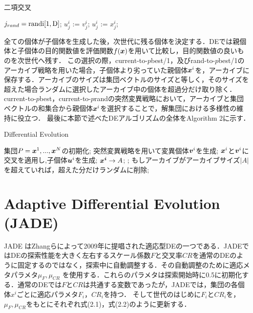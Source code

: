 \documentclass[a4paper,11pt,oneside,openany]{jsbook}
\def\vector#1{\mbox{\boldmath $#1$}}
\begin{document}
\begin{algorithm}
\caption{二項交叉}
\label{alg:pbnf}
\begin{algorithmic}
\STATE $j_{rand} = \rm{randi}[1, D]$;
  \IF {$\rm{rand}[0,1) \leqq $ \OR $j == j_{rand} $}
    \STATE $u^i_j$ := $v^i_j$;
  \ELSE
    \STATE $u^i_j$ := $x^i_j$;
  \ENDIF
\ENDFOR
\end{algorithmic}
\end{algorithm}
全ての個体が子個体を生成した後，次世代に残る個体を決定する．DEでは親個体と子個体の目的関数値を評価関数$f(\vector{x})$を用いて比較し，目的関数値の良いものを次世代へ残す．
この選択の際，current-to-$p$best/1，及びrand-to-$p$best/1のアーカイブ戦略を用いた場合，子個体より劣っていた親個体$\vector{x}^i$を，アーカイブに保存する．アーカイブのサイズは集団ベクトルのサイズと等しく，そのサイズを超えた場合ランダムに選択したアーカイブ中の個体を超過分だけ取り除く．current-to-$p$best，current-to-$p$randの突然変異戦略において，アーカイブと集団ベクトルの和集合から親個体$\vector{x}^i$を選択することで，解集団における多様性の維持に役立つ．
最後に本節で述べたDEアルゴリズムの全体をAlgorithm 2に示す．

\begin{algorithm}
\caption{Differential Evolution}
\label{alg:pbnf}
\begin{algorithmic}
\STATE 集団$P={\vector{x}^1,...,\vector{x}^N}$の初期化;
        \STATE 突然変異戦略を用いて変異個体{$\vector{v}^i$}を生成;
        \STATE $\vector{x}^i$と$\vector{v}^i$に交叉を適用し,子個体$\vector{u}^i$を生成;
    \ENDFOR
        \IF {$f(\vector{u}^i) \leqq f(\vector{x}^i)$}
            \STATE $\vector{x^i} \rightarrow {A}$;
            \STATE {$\vector{x}^i :=\vector{u}^i$};
        \ENDIF
    \ENDFOR
    \STATE もしアーカイブがアーカイブサイズ$|A|$を超えていれば，超えた分だけランダムに削除;
\ENDWHILE
\end{algorithmic}
\end{algorithm}


\section{Adaptive Differential Evolution (JADE)}
JADE \cite{JADE} はZhangらによって2009年に提唱された適応型DEの一つである．JADEではDEの探索性能を大きく左右するスケール係数$F$と交叉率$CR$を通常のDEのように固定するのではなく，探索中に自動調整する．その自動調整のために適応メタパラメタ$\mu _F,\mu _{CR}$ を使用する．これらのパラメタは探索開始時に0.5に初期化する．通常のDEでは$F$と$CR$は共通する変数であったが，JADEでは，集団の各個体\vector{x^i}ごとに適応パラメタ$F_i$，$CR_i$を持つ．
そして世代のはじめに$F_i$と$CR_i$を，$\mu _F,\mu _{CR}$をもとにそれぞれ式(2.1)，式(2.2)のように更新する．
\end{document}
